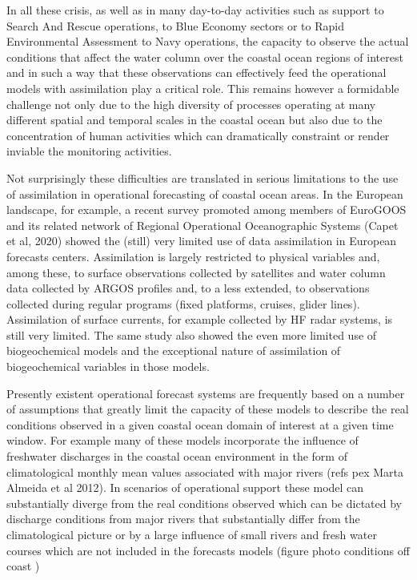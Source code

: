 In all these crisis, as well as in many day-to-day activities such as
support to Search And Rescue operations, to Blue Economy sectors or to
Rapid Environmental Assessment to Navy operations, the capacity to
observe the actual conditions that affect the water column over the
coastal ocean regions of interest and in such a way that these
observations can effectively feed the operational models with
assimilation play a critical role. This remains however a formidable
challenge not only due to the high diversity of processes operating at
many different spatial and temporal scales in the coastal ocean but also
due to the concentration of human activities which can dramatically
constraint or render inviable the monitoring activities.

Not surprisingly these difficulties are translated in serious
limitations to the use of assimilation in operational forecasting of
coastal ocean areas. In the European landscape, for example, a recent
survey promoted among members of EuroGOOS and its related network of
Regional Operational Oceanographic Systems (Capet et al, 2020) showed
the (still) very limited use of data assimilation in European forecasts
centers. Assimilation is largely restricted to physical variables and,
among these, to surface observations collected by satellites and water
column data collected by ARGOS profiles and, to a less extended, to
observations collected during regular programs (fixed platforms,
cruises, glider lines). Assimilation of surface currents, for example
collected by HF radar systems, is still very limited. The same study
also showed the even more limited use of biogeochemical models and the
exceptional nature of assimilation of biogeochemical variables in those
models.
 
Presently existent operational forecast systems are frequently based on
a number of assumptions that greatly limit the capacity of these models
to describe the real conditions observed in a given coastal ocean domain
of interest at a given time window. For example many of these models
incorporate the influence of freshwater discharges in the coastal ocean
environment in the form of climatological monthly mean values associated
with major rivers (refs pex Marta Almeida et al 2012). In scenarios of
operational support these model can substantially diverge from the real
conditions observed which can be dictated by discharge conditions from
major rivers that substantially differ from the climatological picture
or by a large influence of small rivers and fresh water courses which
are not included in the forecasts models (figure photo conditions off
coast \naze)
 

